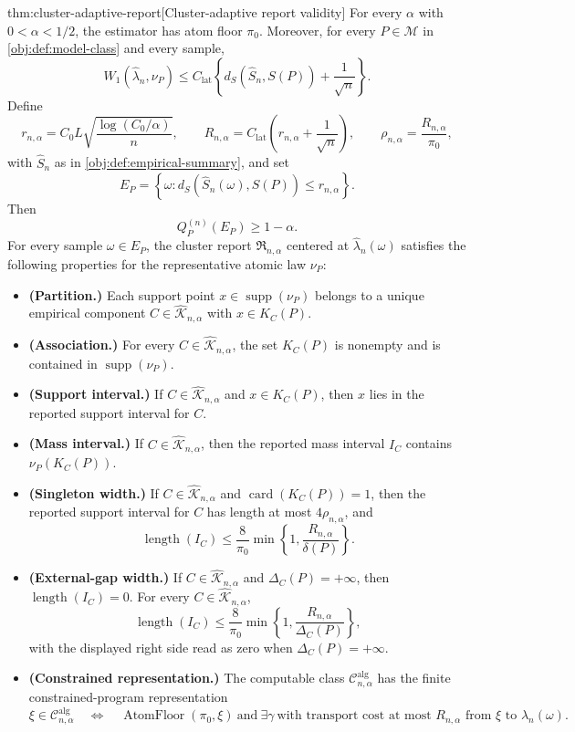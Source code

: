 \documentclass[11pt]{article}
\begin{document}
\begin{theoremv}{thm:cluster-adaptive-report}[Cluster-adaptive report validity]
For every \(\alpha\) with \(0<\alpha<1/2\), the estimator has atom floor \(\pi_0\).  Moreover, for every \(P\in\mathcal M\) in \cref{obj:def:model-class} and every sample,
\[
W_1\!\left(\widehat\lambda_n,\nu_P\right)
\le
C_{\mathrm{lat}}
\left\{
d_S\!\left(\widehat S_n,S(P)\right)+\frac{1}{\sqrt n}
\right\}.
\]
Define
\[
r_{n,\alpha}
=
C_0L\sqrt{\frac{\log(C_0/\alpha)}{n}},
\qquad
R_{n,\alpha}
=
C_{\mathrm{lat}}\left(r_{n,\alpha}+\frac{1}{\sqrt n}\right),
\qquad
\rho_{n,\alpha}=\frac{R_{n,\alpha}}{\pi_0},
\]
with \(\widehat S_n\) as in \cref{obj:def:empirical-summary}, and set
\[
E_P=\left\{\omega:
d_S\!\left(\widehat S_n(\omega),S(P)\right)\le r_{n,\alpha}
\right\}.
\]
Then
\[
Q_P^{(n)}(E_P)\ge 1-\alpha.
\]
For every sample \(\omega\in E_P\), the cluster report \(\mathfrak R_{n,\alpha}\) centered at \(\widehat\lambda_n(\omega)\) satisfies the following properties for the representative atomic law \(\nu_P\):
\begin{itemize}
\item \textbf{(Partition.)} Each support point \(x\in\operatorname{supp}(\nu_P)\) belongs to a unique empirical component \(C\in\widehat{\mathscr K}_{n,\alpha}\) with \(x\in K_C(P)\).
\item \textbf{(Association.)} For every \(C\in\widehat{\mathscr K}_{n,\alpha}\), the set \(K_C(P)\) is nonempty and is contained in \(\operatorname{supp}(\nu_P)\).
\item \textbf{(Support interval.)} If \(C\in\widehat{\mathscr K}_{n,\alpha}\) and \(x\in K_C(P)\), then \(x\) lies in the reported support interval for \(C\).
\item \textbf{(Mass interval.)} If \(C\in\widehat{\mathscr K}_{n,\alpha}\), then the reported mass interval \(I_C\) contains \(\nu_P(K_C(P))\).
\item \textbf{(Singleton width.)} If \(C\in\widehat{\mathscr K}_{n,\alpha}\) and \(\operatorname{card}(K_C(P))=1\), then the reported support interval for \(C\) has length at most \(4\rho_{n,\alpha}\), and
\[
\operatorname{length}(I_C)
\le
\frac{8}{\pi_0}
\min\left\{1,\frac{R_{n,\alpha}}{\delta(P)}\right\}.
\]
\item \textbf{(External-gap width.)} If \(C\in\widehat{\mathscr K}_{n,\alpha}\) and \(\Delta_C(P)=+\infty\), then \(\operatorname{length}(I_C)=0\).  For every \(C\in\widehat{\mathscr K}_{n,\alpha}\),
\[
\operatorname{length}(I_C)
\le
\frac{8}{\pi_0}
\min\left\{1,\frac{R_{n,\alpha}}{\Delta_C(P)}\right\},
\]
with the displayed right side read as zero when \(\Delta_C(P)=+\infty\).
\item \textbf{(Constrained representation.)} The computable class
\(\mathcal C^{\mathrm{alg}}_{n,\alpha}\) has the finite constrained-program representation
\[
\xi\in\mathcal C^{\mathrm{alg}}_{n,\alpha}
\quad\Longleftrightarrow\quad
\operatorname{AtomFloor}(\pi_0,\xi)
\ \text{and}\ 
\exists\gamma\ \text{with transport cost at most } R_{n,\alpha}
\text{ from }\xi\text{ to }\widehat\lambda_n(\omega).
\]
\end{itemize}
\end{theoremv}
\end{document}
